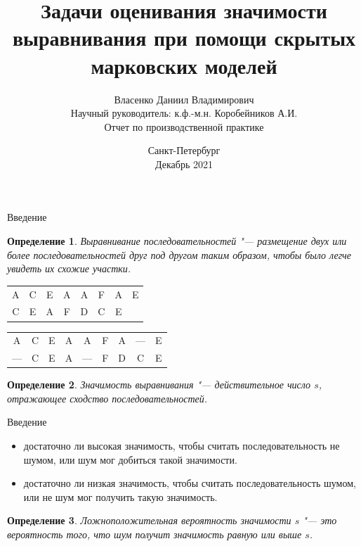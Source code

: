 \documentclass{beamer}
\title[Оценивание значимости выравнивания]{Задачи оценивания значимости выравнивания при помощи скрытых марковских моделей}
\author[Власенко Даниил]{Власенко Даниил Владимирович \\ Научный руководитель: к.ф.-м.н. Коробейников А.И.\\ \vspace{1cm} Отчет по производственной практике}
\date[Декабрь 2021]{Санкт-Петербург\\Декабрь 2021}
\institute[]{Санкт-Петербургский государственный университет\\ Кафедра "Статистического моделирования"}
\newtheorem{defenition}{Определение}
\begin{document}
	\begin{frame}
		\titlepage
	\end{frame}

	\begin{frame}{Введение}
		\begin{defenition}
			Выравнивание последовательностей  "--- размещение двух или более последовательностей друг под другом таким образом, чтобы было легче увидеть их схожие участки.
		\end{defenition}
	
		\begin{center}
			\begin{tabular}{cccccccc}
				A&C&E&A&A&F&A&E\\
				C&E&A&F&D&C&E&\\
			\end{tabular}
		\end{center}
		\begin{center}
			\begin{tabular}{ccccccccc}
				A&C&E&A&A&F&A&—&E\\
				—&C&E&A&—&F&D&C&E\\
			\end{tabular}
		\end{center}
	
		\begin{defenition}
			Значимость выравнивания "--- действительное число $s$, отражающее сходство последовательностей.
		\end{defenition}
	\end{frame}

	\begin{frame}{Введение}
		\begin{itemize}
			\item достаточно ли высокая значимость, чтобы считать последовательность не шумом, или шум мог добиться такой значимости.
			\item достаточно ли низкая значимость, чтобы считать последовательность шумом, или не шум мог получить такую значимость. 
		\end{itemize}
	
		\begin{defenition}
			Ложноположительная вероятность значимости $s$ "--- это вероятность того, что шум получит значимость равную или выше $s$. 
		\end{defenition}
	\end{frame}
\end{document}
